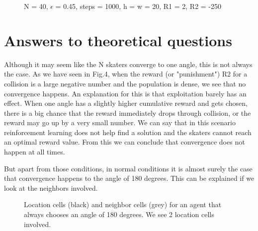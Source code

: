 \documentclass[a4paper]{article}
\begin{document}
\begin{figure}[h]
\caption{N = 40, $\epsilon$ = 0.45, steps = 1000, h = w = 20, R1 = 2, R2 = -250} 
\end{figure}

\pagebreak

\section{Answers to theoretical questions}
Although it may seem like the N skaters converge to one angle, this is not always the case. As we have seen in Fig.4, when the reward (or "punishment") R2 for a collision is a large negative number and the population is dense, we see that no convergence happens. An explanation for this is that exploitation barely has an effect. When one angle has a slightly higher cumulative reward and gets chosen, there is a big chance that the reward immediately drops through collision, or the reward may go up by a very small number. We can say that in this scenario reinforcement learning does not help find a solution and the skaters cannot reach an optimal reward value. From this we can conclude that convergence does not happen at all times.

But apart from those conditions, in normal conditions it is almost surely the case that convergence happens to the angle of 180 degrees. This can be explained if we look at the neighbors involved.

\begin{figure}[h]
\caption{Location cells (black) and neighbor cells (grey) for an agent that always chooses an angle of 180 degrees. We see 2 location cells involved.} 
\end{figure}
\end{document}
